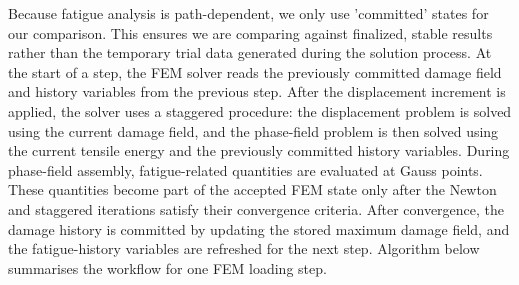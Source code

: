Because fatigue analysis is path-dependent, we only use 'committed' states for our comparison. This ensures we are comparing against finalized, stable results rather than the temporary trial data generated during the solution process. At the start of a step, the FEM solver reads the previously committed damage field and history variables from the previous step. After the displacement increment is applied, the solver uses a staggered procedure: the displacement problem is solved using the current damage field, and the phase-field problem is then solved using the current tensile energy and the previously committed history variables. During phase-field assembly, fatigue-related quantities are evaluated at Gauss points. These quantities become part of the accepted FEM state only after the Newton and staggered iterations satisfy their convergence criteria. After convergence, the damage history is committed by updating the stored maximum damage field, and the fatigue-history variables are refreshed for the next step. Algorithm below summarises the workflow for one FEM loading step. 


